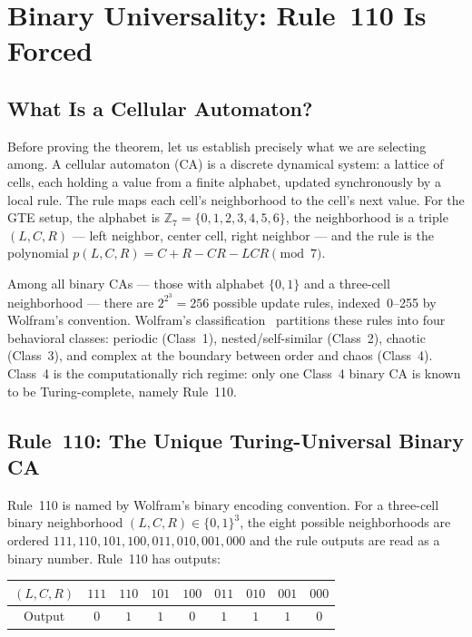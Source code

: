 \documentclass[11pt,openany]{book}
\theoremstyle{remark}
\begin{document}
\FloatBarrier

\section{Binary Universality: Rule~110 Is Forced}
\label{sec:rule110}

\subsection*{What Is a Cellular Automaton?}

Before proving the theorem, let us establish precisely what we are selecting among.
A cellular automaton (CA) is a discrete dynamical system: a lattice of cells, each
holding a value from a finite alphabet, updated synchronously by a local rule. The
rule maps each cell's neighborhood to the cell's next value. For the GTE setup, the
alphabet is $\mathbb{Z}_7 = \{0,1,2,3,4,5,6\}$, the neighborhood is a triple
$(L,C,R)$ --- left neighbor, center cell, right neighbor --- and the rule is the
polynomial $p(L,C,R) = C+R-CR-LCR \pmod{7}$.

Among all binary CAs --- those with alphabet $\{0,1\}$ and a three-cell neighborhood
--- there are $2^{2^3} = 256$ possible update rules, indexed~0--255 by Wolfram's
convention. Wolfram's classification~\cite{Wolfram2002} partitions these rules into
four behavioral classes: periodic (Class~1), nested/self-similar (Class~2), chaotic
(Class~3), and complex at the boundary between order and chaos (Class~4). Class~4 is
the computationally rich regime: only one Class~4 binary CA is known to be
Turing-complete, namely Rule~110.

\subsection*{Rule~110: The Unique Turing-Universal Binary CA}

Rule~110 is named by Wolfram's binary encoding convention. For a three-cell binary
neighborhood $(L,C,R) \in \{0,1\}^3$, the eight possible neighborhoods are ordered
$111, 110, 101, 100, 011, 010, 001, 000$ and the rule outputs are read as a binary
number. Rule~110 has outputs:

\begin{center}
\begin{tabular}{ccccccccc}
\toprule
$(L,C,R)$ & $111$ & $110$ & $101$ & $100$ & $011$ & $010$ & $001$ & $000$ \\
\midrule
Output   &  $0$  &  $1$  &  $1$  &  $0$  &  $1$  &  $1$  &  $1$  &  $0$  \\
\bottomrule
\end{tabular}
\end{center}
\end{document}
